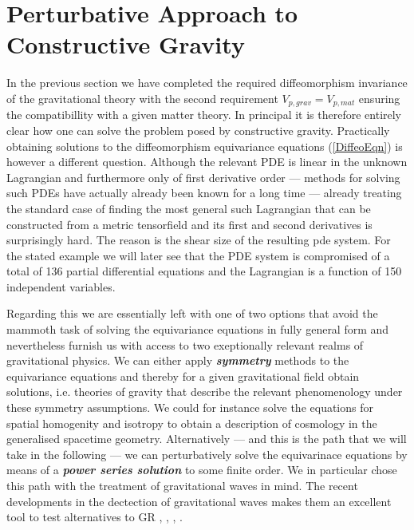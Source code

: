 \documentclass[a4paper,12pt, DIV=14, BCOR=5mm, twoside, headsepline]{scrbook}
\begin{document}
\section{Perturbative Approach to Constructive Gravity}
In the previous section we have completed the required diffeomorphism invariance of the gravitational theory with the second requirement $V_{p,grav}=V_{p,mat}$ ensuring the compatibillity with a given matter theory. In principal it is therefore entirely clear how one can solve the problem posed by constructive gravity. Practically obtaining solutions to the diffeomorphism equivariance equations (\ref{DiffeoEqn}) is however a different question. Although the relevant PDE is linear in the unknown Lagrangian and furthermore only of first derivative order --- methods for solving  such PDEs have actually already been known for a long time \cite{Han2015} --- already treating the standard case of finding the most general such Lagrangian that can be constructed from a metric tensorfield and its first and second derivatives is surprisingly hard. The reason is the shear size of the resulting pde system. For the stated example we will later see that the PDE system is compromised of a total of 136 partial differential equations and the Lagrangian is a function of 150 independent variables.  

Regarding this we are essentially left with one of two options that avoid the mammoth task of solving the equivariance equations in fully general form and nevertheless furnish us with access to two exeptionally relevant realms of gravitational physics. We can either apply \textbf{\textit{symmetry}} methods to the equivariance equations and thereby for a given gravitational field obtain solutions, i.e. theories of gravity that describe the relevant phenomenology under these symmetry assumptions. We could for instance solve the equations for spatial homogenity and isotropy to obtain a description of cosmology in the generalised spacetime geometry. Alternatively --- and this is the path that we will take in the following --- we can perturbatively solve the equivarinace equations by means of a \textit{\textbf{power series solution}} to some finite order. We in particular chose this path with the treatment of gravitational waves in mind.  The recent developments in the dectection of gravitational waves makes them an excellent tool to test alternatives to GR \cite{2010PhRvD..81f4008Y}, \cite{2011PhRvD..83j4022B}, \cite{2017PhRvD..95j4027Z}, \cite{2013LRR....16....9Y}. \\
\end{document}

